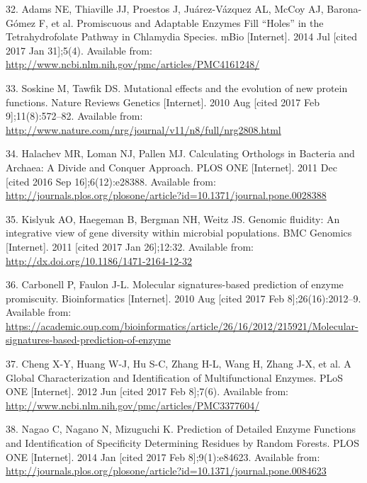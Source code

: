 \documentclass[12pt,twoside]{reedthesis}
\begin{document}
  \hypertarget{ref-adams_promiscuous_2014}{}
  32. Adams NE, Thiaville JJ, Proestos J, Juárez-Vázquez AL, McCoy AJ,
  Barona-Gómez F, et al. Promiscuous and Adaptable Enzymes Fill ``Holes''
  in the Tetrahydrofolate Pathway in Chlamydia Species. mBio
  {[}Internet{]}. 2014 Jul {[}cited 2017 Jan 31{]};5(4). Available from:
  \url{http://www.ncbi.nlm.nih.gov/pmc/articles/PMC4161248/}
  
  \hypertarget{ref-soskine_mutational_2010}{}
  33. Soskine M, Tawfik DS. Mutational effects and the evolution of new
  protein functions. Nature Reviews Genetics {[}Internet{]}. 2010 Aug
  {[}cited 2017 Feb 9{]};11(8):572--82. Available from:
  \url{http://www.nature.com/nrg/journal/v11/n8/full/nrg2808.html}
  
  \hypertarget{ref-halachev_calculating_2011}{}
  34. Halachev MR, Loman NJ, Pallen MJ. Calculating Orthologs in Bacteria
  and Archaea: A Divide and Conquer Approach. PLOS ONE {[}Internet{]}.
  2011 Dec {[}cited 2016 Sep 16{]};6(12):e28388. Available from:
  \url{http://journals.plos.org/plosone/article?id=10.1371/journal.pone.0028388}
  
  \hypertarget{ref-kislyuk_genomic_2011}{}
  35. Kislyuk AO, Haegeman B, Bergman NH, Weitz JS. Genomic fluidity: An
  integrative view of gene diversity within microbial populations. BMC
  Genomics {[}Internet{]}. 2011 {[}cited 2017 Jan 26{]};12:32. Available
  from: \url{http://dx.doi.org/10.1186/1471-2164-12-32}
  
  \hypertarget{ref-carbonell_molecular_2010}{}
  36. Carbonell P, Faulon J-L. Molecular signatures-based prediction of
  enzyme promiscuity. Bioinformatics {[}Internet{]}. 2010 Aug {[}cited
  2017 Feb 8{]};26(16):2012--9. Available from:
  \url{https://academic.oup.com/bioinformatics/article/26/16/2012/215921/Molecular-signatures-based-prediction-of-enzyme}
  
  \hypertarget{ref-cheng_global_2012}{}
  37. Cheng X-Y, Huang W-J, Hu S-C, Zhang H-L, Wang H, Zhang J-X, et al. A
  Global Characterization and Identification of Multifunctional Enzymes.
  PLoS ONE {[}Internet{]}. 2012 Jun {[}cited 2017 Feb 8{]};7(6). Available
  from: \url{http://www.ncbi.nlm.nih.gov/pmc/articles/PMC3377604/}
  
  \hypertarget{ref-nagao_prediction_2014}{}
  38. Nagao C, Nagano N, Mizuguchi K. Prediction of Detailed Enzyme
  Functions and Identification of Specificity Determining Residues by
  Random Forests. PLOS ONE {[}Internet{]}. 2014 Jan {[}cited 2017 Feb
  8{]};9(1):e84623. Available from:
  \url{http://journals.plos.org/plosone/article?id=10.1371/journal.pone.0084623}
  
\end{document}

